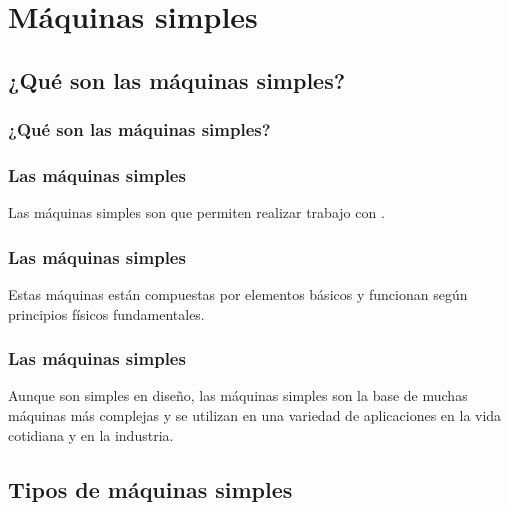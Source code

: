 \documentclass[14pt]{beamer}
\begin{document}
\section{Máquinas simples}
\subsection{¿Qué son las máquinas simples?}

\begin{frame}
\frametitle{¿Qué son las máquinas simples?}
\end{frame}
\begin{frame}
\frametitle{Las máquinas simples}
Las máquinas simples son  que permiten realizar trabajo con .
\end{frame}
\begin{frame}
\frametitle{Las máquinas simples}
Estas máquinas están compuestas por elementos básicos y funcionan según principios físicos fundamentales.
\end{frame}
\begin{frame}
\frametitle{Las máquinas simples}
Aunque son simples en diseño, las máquinas simples son la base de muchas máquinas más complejas y se utilizan en una variedad de aplicaciones en la vida cotidiana y en la industria.
\end{frame}

\subsection{Tipos de máquinas simples}
\end{document}
